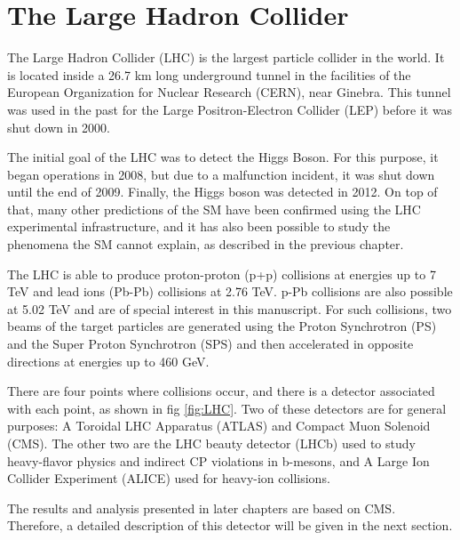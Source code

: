\chapter{\leavevmode\newline The Large Hadron Collider}
\label{chap:chapter_2}

The Large Hadron Collider (LHC) is the largest particle collider in the world. It is located inside a 26.7 km long underground tunnel in the facilities of the European Organization for Nuclear Research (CERN), near Ginebra. This tunnel was used in the past for the Large Positron-Electron Collider (LEP) before it was shut down in 2000.

The initial goal of the LHC was to detect the Higgs Boson. For this purpose, it began operations in 2008, but due to a malfunction incident, it was shut down until the end of 2009. Finally, the Higgs boson was detected in 2012. On top of that, many other predictions of the SM have been confirmed using the LHC experimental infrastructure, and it has also been possible to study the phenomena the SM cannot explain, as described in the previous chapter.

The LHC is able to produce proton-proton (p+p) collisions at energies up to 7 TeV and lead ions (Pb-Pb) collisions at 2.76 TeV. p-Pb collisions are also possible at 5.02 TeV \cite{vovchenko2019canonical} and are of special interest in this manuscript. For such collisions, two beams of the target particles are generated using the Proton Synchrotron (PS) and the Super Proton Synchrotron (SPS) and then accelerated in opposite directions at energies up to 460 GeV.

There are four points where collisions occur, and there is a detector associated with each point, as shown in fig \ref{fig:LHC}. Two of these detectors are for general purposes: A Toroidal LHC Apparatus (ATLAS) and Compact Muon Solenoid (CMS). The other two are the LHC beauty detector (LHCb) used to study heavy-flavor physics and indirect CP violations in b-mesons, and A Large Ion Collider Experiment (ALICE) used for heavy-ion collisions.

The results and analysis presented in later chapters are based on CMS. Therefore, a detailed description of this detector will be given in the next section.

